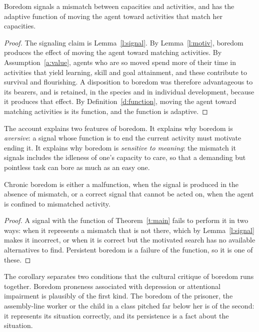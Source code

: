 \documentclass{situationist-preprint}
\begin{document}
\begin{theorem}\label{t:main}
Boredom signals a mismatch between capacities and activities, and has the adaptive function of moving the agent toward activities that match her capacities.
\end{theorem}

\begin{proof}
The signaling claim is Lemma~\ref{l:signal}. By Lemma~\ref{l:motiv}, boredom produces the effect of moving the agent toward matching activities. By Assumption~\ref{a:value}, agents who are so moved spend more of their time in activities that yield learning, skill and goal attainment, and these contribute to survival and flourishing. A disposition to boredom was therefore advantageous to its bearers, and is retained, in the species and in individual development, because it produces that effect. By Definition~\ref{d:function}, moving the agent toward matching activities is its function, and the function is adaptive.
\end{proof}

The account explains two features of boredom. It explains why boredom is \emph{aversive}: a signal whose function is to end the current activity must motivate ending it. It explains why boredom is \emph{sensitive to meaning}: the mismatch it signals includes the idleness of one's capacity to care, so that a demanding but pointless task can bore as much as an easy one.

\begin{corollary}\label{c:chronic}
Chronic boredom is either a malfunction, when the signal is produced in the absence of mismatch, or a correct signal that cannot be acted on, when the agent is confined to mismatched activity.
\end{corollary}

\begin{proof}
A signal with the function of Theorem~\ref{t:main} fails to perform it in two ways: when it represents a mismatch that is not there, which by Lemma~\ref{l:signal} makes it incorrect, or when it is correct but the motivated search has no available alternatives to find. Persistent boredom is a failure of the function, so it is one of these.
\end{proof}

The corollary separates two conditions that the cultural critique of boredom runs together. Boredom proneness associated with depression or attentional impairment is plausibly of the first kind. The boredom of the prisoner, the assembly-line worker or the child in a class pitched far below her is of the second: it represents its situation correctly, and its persistence is a fact about the situation.
\end{document}
